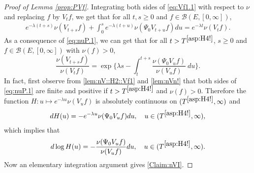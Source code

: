 \documentclass[12pt,a4paper]{amsart}
\numberwithin{equation}{section}
\theoremstyle{plain}
\theoremstyle{definition}
\theoremstyle{remark}
\begin{document}
\begin{proof}[Proof of Lemma \ref{prop:PVf}]
	
	Integrating  both sides of \eqref{eq:Vf1.1} with respect to $\nu$ and replacing $f$ by $V_t f$, we get that for all $t, s\geq 0$ and $f\in \mathcal B(E,[0,\infty])$,
\begin{align}\label{eq:nuP.1}
	e^{- \lambda (t+s)} \nu(V_{t+s}f) + \int_0^s e^{- \lambda (t+u)} \nu(\Psi_0 V_{t+u}f) du
	= e^{- \lambda t} \nu(V_t f).
\end{align}
	As a consequence of \eqref{eq:nuP.1}, we can get that for all $t>T^{\eqref{asp:H4!}}$, $s\geq 0$ and $f \in \mathcal B(E,[0,\infty])$ with $\nu(f)>0$,
\begin{equation}\label{Claim:nVI}
	\frac{\nu(V_{t+s} f)} {\nu(V_t f)}
	= \exp\Big\{ \lambda s - \int_t^{t+s} \frac{\nu(\Psi_0 V_u f) }{\nu(V_u f)} ~du\Big\}.
\end{equation}
	In fact, first observe from \eqref{lem:nV::H2::Vf1} and \eqref{lem:nVn!} that both sides of \eqref{eq:nuP.1} are finite and positive if $t> T^{\eqref{asp:H4!}}$ and $\nu(f)>0$.
	Therefore the function $H: u\mapsto e^{-\lambda u}\nu(V_u f)$ is absolutely continuous on $(T^{\eqref{asp:H4!}},\infty)$ and
\begin{align}
	d H(u)
	= - e^{- \lambda u} \nu(\Psi_0 V_u f) du,
	\quad u\in (T^{\eqref{asp:H4!}},\infty),
\end{align}
	which implies that
\begin{align}
	d \log H(u)
	= - \frac{\nu(\Psi_0 V_u f )}{ \nu(V_u f)} du,
	\quad u \in (T^{\eqref{asp:H4!}},\infty).
\end{align}
	Now an elementary integration argument gives \eqref{Claim:nVI}.
	

\end{proof}
\end{document}
